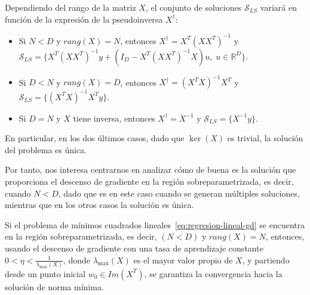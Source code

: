 \begin{observacion}
    Dependiendo del rango de la matriz $X$, el conjunto de soluciones $\mathcal{S}_{LS}$ variará en función de la expresión de la pseudoinversa $X^{\dagger}$:

    \begin{itemize}
        \item Si $N < D$ y $rang(X) = N$, entonces $X^{\dagger} = X^{T}{(XX^{T})}^{-1}$ y $\mathcal{S}_{LS} = \{ X^{T}{(XX^{T})}^{-1}y + (I_D-X^{T}{(XX^{T})}^{-1}X)u, \; u \in \mathbb{R}^{D} \}$.
        
        \item Si $D < N$ y $rang(X) = D$, entonces $X^{\dagger} = {(X^{T}X)}^{-1}X^{T}$ y $\mathcal{S}_{LS} = \{ {(X^{T}X)}^{-1}X^{T}y \}$.
        
        \item Si $D = N$ y $X$ tiene inversa, entonces $X^{\dagger} = {X}^{-1}$ y $\mathcal{S}_{LS} = \{{X}^{-1}y \}$.
    \end{itemize}

    En particular, en los dos últimos casos, dado que $\ker(X)$ es trivial, la solución del problema es única.
\end{observacion}

Por tanto, nos interesa centrarnos en analizar cómo de buena es la solución que proporciona el descenso de gradiente en la región sobreparametrizada, es decir, cuando $N < D$, dado que es en este caso cuando se generan múltiples soluciones, mientras que en los otros casos la solución es única.

\begin{teorema}
    Si el problema de mínimos cuadrados lineales~\eqref{eq:regresion-lineal-gd} se encuentra en la región sobreparametrizada, es decir, $(N < D)$ y $rang(X) = N$, entonces, usando el descenso de gradiente con una tasa de aprendizaje constante $0 < \eta < \frac{1}{\lambda_{\max}(X)}$, donde $\lambda_{\max}(X)$ es el mayor valor propio de $X$, y partiendo desde un punto inicial $w_0 \in Im(X^{T})$, se garantiza la convergencia hacia la solución de norma mínima.
\end{teorema}

